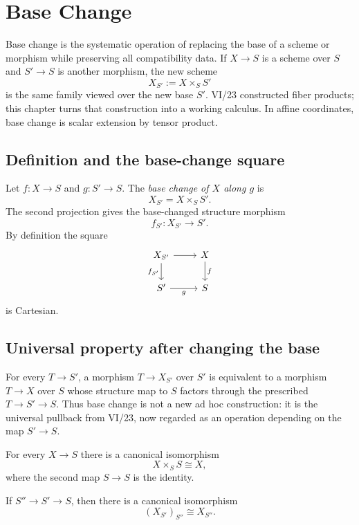 \chapter{Base Change}\label{ch:vi24-base-change}

Base change is the systematic operation of replacing the base of a scheme or morphism while
preserving all compatibility data.  If $X\to S$ is a scheme over $S$ and $S'\to S$ is another
morphism, the new scheme
\[
X_{S'}:=X\times_S S'
\]
is the same family viewed over the new base $S'$.  VI/23 constructed fiber products; this chapter
turns that construction into a working calculus.  In affine coordinates, base change is scalar
extension by tensor product.

\section{Definition and the base-change square}
Let $f:X\to S$ and $g:S'\to S$.  The \emph{base change of $X$ along $g$} is
\[
X_{S'}=X\times_S S'.
\]
The second projection gives the base-changed structure morphism
\[
f_{S'}:X_{S'}\longrightarrow S'.
\]
By definition the square
\[
\begin{tikzcd}
X_{S'} \arrow[r] \arrow[d,"f_{S'}"'] & X \arrow[d,"f"]\\
S' \arrow[r,"g"'] & S
\end{tikzcd}
\]
is Cartesian.



\section{Universal property after changing the base}
For every $T\to S'$, a morphism $T\to X_{S'}$ over $S'$ is equivalent to a morphism
$T\to X$ over $S$ whose structure map to $S$ factors through the prescribed $T\to S'\to S$.
Thus base change is not a new ad hoc construction: it is the universal pullback from VI/23, now
regarded as an operation depending on the map $S'\to S$.

\begin{proposition}\label{prop:vi24-identity}
For every $X\to S$ there is a canonical isomorphism
\[
X\times_S S\cong X,
\]
where the second map $S\to S$ is the identity.
\end{proposition}

\begin{proposition}\label{prop:vi24-iterated}
If $S''\to S'\to S$, then there is a canonical isomorphism
\[
(X_{S'})_{S''}\cong X_{S''}.
\]
\end{proposition}

